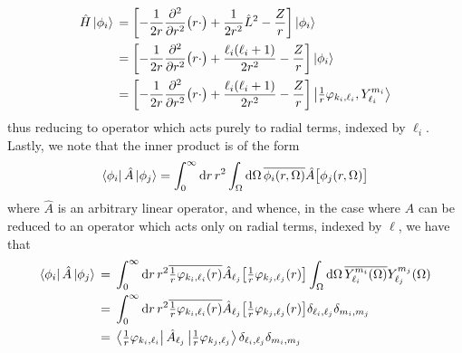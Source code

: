 \documentclass[]{article}
\begin{document}
\begin{alignat*}{2}
  \hat{H}
  \ket{\phi_{i}}
  {}={}
  &
  \lrsq[\bigg]
  {
    -
    \dfrac{1}{2 r}
    \pdv[2]{r}
    \lr[\big]
    {
      r
      \cdot
    }
    +
    \dfrac{1}{2 r^{2}}
    \hat{L}^{2}
    -
    \dfrac{Z}{r}
  }
  \ket{\phi_{i}}
  \\
  {}={}
  &
  \lrsq[\bigg]
  {
    -
    \dfrac{1}{2 r}
    \pdv[2]{r}
    \lr[\big]
    {
      r
      \cdot
    }
    +
    \dfrac
    {
      \ell_{i}
      \lr{\ell_{i} + 1}
    }
    {
      2
      r^{2}
    }
    -
    \dfrac{Z}{r}
  }
  \ket{\phi_{i}}
  \\
  {}={}
  &
  \lrsq[\bigg]
  {
    -
    \dfrac{1}{2 r}
    \pdv[2]{r}
    \lr[\big]
    {
      r
      \cdot
    }
    +
    \dfrac
    {
      \ell_{i}
      \lr{\ell_{i} + 1}
    }
    {
      2
      r^{2}
    }
    -
    \dfrac{Z}{r}
  }
  \ket
  {
    \tfrac{1}{r}\varphi_{k_{i}, \ell_{i}}
    ,
    Y_{\ell_{i}}^{m_{i}}
  }
\end{alignat*}
thus reducing to operator which acts purely to radial terms, indexed by
$\ell_{i}$.
Lastly, we note that the inner product is of the form
\begin{equation*}
  \bra{\phi_{i}}
  \hat{A}
  \ket{\phi_{j}}
  =
  \int_{0}^{\infty}
  \dd{r}
  {
    r^{2}
    \int_{\Omega}
    \dd{\Omega}
    {
      \overline
      {
        \phi_{i}\lr{r, \Omega}
      }
      \hat{A}
      \lrsq[\big]
      {
        \phi_{j}\lr{r, \Omega}
      }
    }
  }
\end{equation*}
where $\hat{A}$ is an arbitrary linear operator, and whence, in the case where
$\hat{A}$ can be reduced to an operator which acts only on radial terms, indexed
by $\ell$, we have that
\begin{alignat*}{2}
  \bra{\phi_{i}}
  \hat{A}
  \ket{\phi_{j}}
  {}={}
  &
  \int_{0}^{\infty}
  \dd{r}
  {
    r^{2}
    \overline
    {
      \tfrac{1}{r}
      \varphi_{k_{i}, \ell_{i}}\lr{r}
    }
    \hat{A}_{\ell_{j}}
    \lrsq[\big]
    {
      \tfrac{1}{r}
      \varphi_{k_{j}, \ell_{j}}\lr{r}
    }
  }
  \int_{\Omega}
  \dd{\Omega}
  {
    \overline
    {
      Y_{\ell_{i}}^{m_{i}}\lr{\Omega}
    }
    Y_{\ell_{j}}^{m_{j}}\lr{\Omega}
  }
  \\
  {}={}
  &
  \int_{0}^{\infty}
  \dd{r}
  {
    r^{2}
    \overline
    {
      \tfrac{1}{r}
      \varphi_{k_{i}, \ell_{i}}\lr{r}
    }
    \hat{A}_{\ell_{j}}
    \lrsq[\big]
    {
      \tfrac{1}{r}
      \varphi_{k_{j}, \ell_{j}}\lr{r}
    }
  }
  \delta_{\ell_{i}, \ell_{j}}
  \delta_{m_{i}, m_{j}}
  \\
  {}={}
  &
  \bra{\tfrac{1}{r}\varphi_{k_{i}, \ell_{i}}}
  \hat{A}_{\ell_{j}}
  \ket{\tfrac{1}{r}\varphi_{k_{j}, \ell_{j}}}
  \delta_{\ell_{i}, \ell_{j}}
  \delta_{m_{i}, m_{j}}
\end{alignat*}
\end{document}
